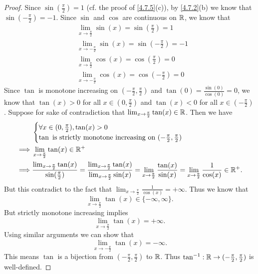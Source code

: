 \begin{proof}
  Since \(\sin(\frac{\pi}{2}) = 1\) (cf. the proof of \cref{4.7.5}(c)), by \cref{4.7.2}(b) we know that \(\sin(-\frac{\pi}{2}) = -1\).
  Since \(\sin\) and \(\cos\) are continuous on \(\mathbb{R}\), we know that
  \begin{align*}
     & \lim_{x \to \frac{\pi}{2}} \sin(x) = \sin(\frac{\pi}{2}) = 1    \\
     & \lim_{x \to -\frac{\pi}{2}} \sin(x) = \sin(-\frac{\pi}{2}) = -1 \\
     & \lim_{x \to \frac{\pi}{2}} \cos(x) = \cos(\frac{\pi}{2}) = 0    \\
     & \lim_{x \to -\frac{\pi}{2}} \cos(x) = \cos(-\frac{\pi}{2}) = 0
  \end{align*}
  Since \(\tan\) is monotone increasing on \((-\frac{\pi}{2}, \frac{\pi}{2})\) and \(\tan(0) = \frac{\sin(0)}{\cos(0)} = 0\), we know that \(\tan(x) > 0\) for all \(x \in (0, \frac{\pi}{2})\) and \(\tan(x) < 0\) for all \(x \in (-\frac{\pi}{2})\).
  Suppose for sake of contradiction that \(\lim_{x \to \frac{\pi}{2}} \tan(x) \in \mathbb{R}\).
  Then we have
  \begin{align*}
             & \begin{cases}
                 \forall x \in (0, \frac{\pi}{2}), \tan(x) > 0 \\
                 \tan \text{ is strictly monotone increasing on } (-\frac{\pi}{2}, \frac{\pi}{2})
               \end{cases}                                                                                                                                                                              \\
    \implies & \lim_{x \to \frac{\pi}{2}} \tan(x) \in \mathbb{R}^+                                                                                                                                                                                                                  \\
    \implies & \frac{\lim_{x \to \frac{\pi}{2}} \tan(x)}{\sin(\frac{\pi}{2})} = \frac{\lim_{x \to \frac{\pi}{2}} \tan(x)}{\lim_{x \to \frac{\pi}{2}} \sin(x)} = \lim_{x \to \frac{\pi}{2}} \frac{\tan(x)}{\sin(x)} = \lim_{x \to \frac{\pi}{2}} \frac{1}{\cos(x)} \in \mathbb{R}^+.
  \end{align*}
  But this contradict to the fact that \(\lim_{x \to \frac{\pi}{2}} \frac{1}{\cos(x)} = +\infty\).
  Thus we know that
  \[
    \lim_{x \to \frac{\pi}{2}} \tan(x) \in \{-\infty, \infty\}.
  \]
  But strictly monotone increasing implies
  \[
    \lim_{x \to \frac{\pi}{2}} \tan(x) = +\infty.
  \]
  Using similar arguments we can show that
  \[
    \lim_{x \to -\frac{\pi}{2}} \tan(x) = -\infty.
  \]
  This means \(\tan\) is a bijection from \((-\frac{\pi}{2}, \frac{\pi}{2})\) to \(\mathbb{R}\).
  Thus \(\tan^{-1} : \mathbb{R} \to (-\frac{\pi}{2}, \frac{\pi}{2})\) is well-defined.


\end{proof}
